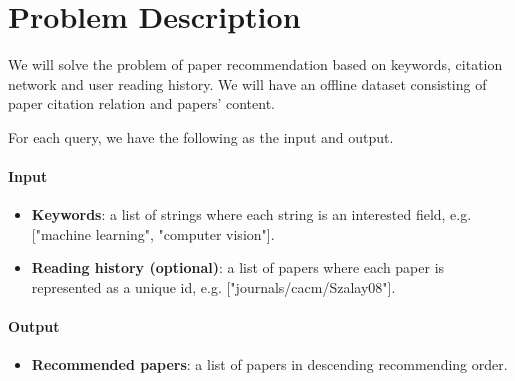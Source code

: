 \section{Problem Description}
%
We will solve the problem of paper recommendation based on keywords, citation network and user reading history. 
We will have an offline dataset consisting of paper citation relation and papers' content.

For each query, we have the following as the input and output.
%
\paragraph{Input}
%
\begin{itemize}
%
  \item \textbf{Keywords}: a list of strings where each string is an interested field, e.g. ["machine learning", "computer vision"].
%
  \item \textbf{Reading history (optional)}: a list of papers where each paper is represented as a unique id, e.g. ["journals/cacm/Szalay08"].
%
\end{itemize}
%
\paragraph{Output}
%
\begin{itemize}
  \item \textbf{Recommended papers}: a list of papers in descending recommending order.
\end{itemize}
%
